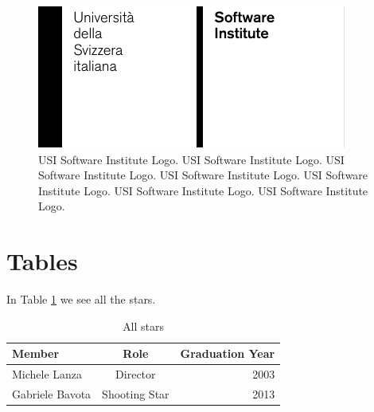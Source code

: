 \begin{figure}[ht]
\centering
\includegraphics[width=0.75\linewidth]{aux/Grid-System-USI-Software.pdf}
\caption{USI Software Institute Logo. USI Software Institute Logo. USI Software Institute Logo. USI Software Institute Logo. USI Software Institute Logo. USI Software Institute Logo. USI Software Institute Logo.}
\end{figure}

\section{Tables}

In Table \ref{tab-allstars} we see all the stars.

\begin{table}[ht]
\centering
\begin{tabular}{lcr} \hline
{\bf Member} & {\bf Role} & {\bf Graduation Year}\\ \hline
Michele Lanza & Director & 2003\\
Gabriele Bavota & Shooting Star & 2013\\ \hline
\end{tabular}
\caption{All stars}
\label{tab-allstars}
\end{table}